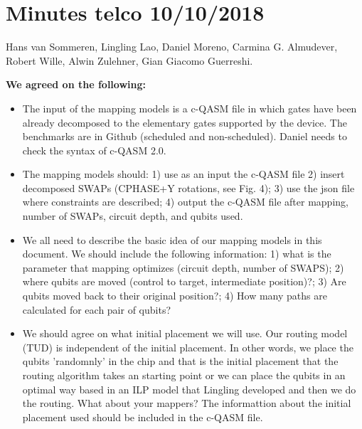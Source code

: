 \documentclass[11pt]{article}
\begin{document}
\newpage

\section{Minutes telco 10/10/2018}

Hans van Sommeren, Lingling Lao, Daniel Moreno, Carmina G. Almudever, Robert Wille, Alwin Zulehner, Gian Giacomo Guerreshi.

\textbf{We agreed on the following:}

\begin{itemize}
    \item The input of the mapping models is a c-QASM file in which gates have been already decomposed to the elementary gates supported by the device. The benchmarks are in Github (scheduled and non-scheduled). Daniel needs to check the syntax of c-QASM 2.0.
    
    \item The mapping models should: 1) use as an input the c-QASM file 2) insert decomposed SWAPs (CPHASE+Y rotations, see Fig. 4); 3) use the json file where constraints are described; 4) output the c-QASM file after mapping, number of SWAPs, circuit depth, and qubits used.
    
    \item We all need to describe the basic idea of our mapping models in this document. We should include the following information: 1) what is the parameter that mapping optimizes (circuit depth, number of SWAPS); 2) where qubits are moved (control to target, intermediate position)?; 3) Are qubits moved back to their original position?; 4) How many paths are calculated for each pair of qubits?
    
    
    \item We should agree on what initial placement we will use. Our routing model (TUD) is independent of the initial placement. In other words, we place the qubits 'randomnly' in the chip and that is the initial placement that the routing algorithm takes an starting point or we can place the qubits in an optimal way based in an ILP model that Lingling developed and then we do the routing. What about your mappers? The informattion about the initial placement used should be included in the c-QASM file.
    
    \end{itemize}
    
\end{document}
